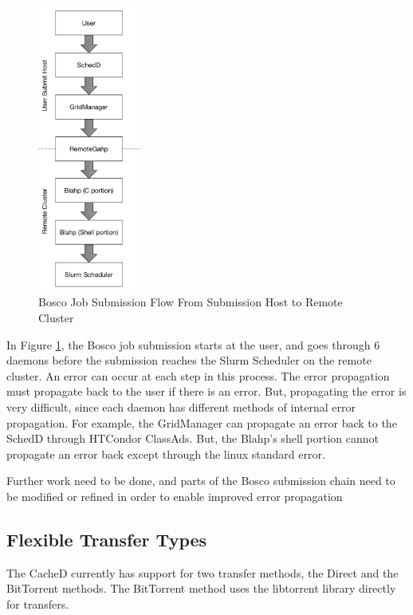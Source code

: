 \begin{figure}[h!t]
	\centering
	\includegraphics[width=0.3\textwidth]{images/JobSubmitFlow.pdf}
	\caption{Bosco Job Submission Flow From Submission Host to Remote Cluster}
	\label{fig:boscojobsubmitflowconclusion}
\end{figure}

In Figure \ref{fig:boscojobsubmitflowconclusion}, the Bosco job submission starts at the user, and goes through 6 daemons before the submission reaches the Slurm Scheduler on the remote cluster.  An error can occur at each step in this process.  The error propagation must propagate back to the user if there is an error.  But, propagating the error is very difficult, since each daemon has different methods of internal error propagation.  For example, the GridManager can propagate an error back to the SchedD through HTCondor ClassAds.  But, the Blahp's shell portion cannot propagate an error back except through the linux standard error.

Further work need to be done, and parts of the Bosco submission chain need to be modified or refined in order to enable improved error propagation

\subsection{Flexible Transfer Types}

The CacheD currently has support for two transfer methods, the Direct and the BitTorrent methods.  The BitTorrent method uses the libtorrent library directly for transfers.

